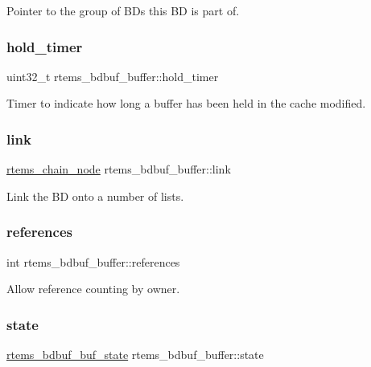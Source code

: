 Pointer to the group of B\+Ds this BD is part of. \mbox{\label{structrtems__bdbuf__buffer_aec2379d26f4703257d9843bff6f6f733}} 
\subsubsection{\texorpdfstring{hold\_timer}{hold\_timer}}
{\footnotesize\ttfamily uint32\+\_\+t rtems\+\_\+bdbuf\+\_\+buffer\+::hold\+\_\+timer}

Timer to indicate how long a buffer has been held in the cache modified. \mbox{\label{structrtems__bdbuf__buffer_adc0235d4ee0b777a16433f3057cacdb8}} 
\subsubsection{\texorpdfstring{link}{link}}
{\footnotesize\ttfamily \mbox{\hyperlink{structChain__Node__struct}{rtems\+\_\+chain\+\_\+node}} rtems\+\_\+bdbuf\+\_\+buffer\+::link}

Link the BD onto a number of lists. \mbox{\label{structrtems__bdbuf__buffer_a8d37d05349026cb2504cf7f692a798db}} 
\subsubsection{\texorpdfstring{references}{references}}
{\footnotesize\ttfamily int rtems\+\_\+bdbuf\+\_\+buffer\+::references}

Allow reference counting by owner. \mbox{\label{structrtems__bdbuf__buffer_aee5d6927ffc83840b051e62f40ed4377}} 
\subsubsection{\texorpdfstring{state}{state}}
{\footnotesize\ttfamily \mbox{\hyperlink{group__rtems__bdbuf_ga0169f36547d36f0723b6456172eeef0a}{rtems\+\_\+bdbuf\+\_\+buf\+\_\+state}} rtems\+\_\+bdbuf\+\_\+buffer\+::state}


